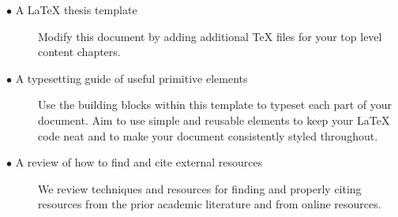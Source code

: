 	\begin{description}	
	
		\item[$\bullet$ A LaTeX thesis template]\hfill
		
		Modify this document by adding additional TeX files for your top level content chapters. 
		
		\item[$\bullet$ A typesetting guide of useful primitive elements]\hfill
		
		Use the building blocks within this template to typeset each part of your document. Aim to use simple and reusable elements to keep your LaTeX code neat and to make your document consistently styled throughout.
		
		\item[$\bullet$ A review of how to find and cite external resources]\hfill
					
		We review techniques and resources for finding and properly citing resources from the prior academic literature and from online resources.
		
	\end{description}